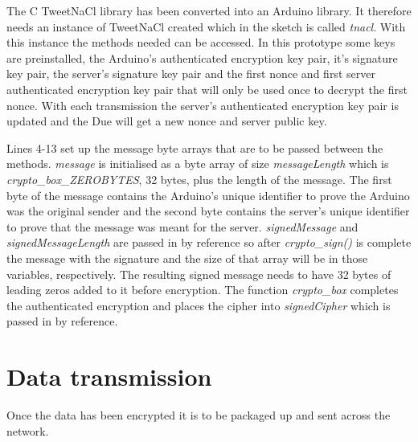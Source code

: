 The C TweetNaCl library has been converted into an Arduino library. It therefore needs an instance of TweetNaCl created which in the sketch is called \emph{tnacl}. With this instance the methods needed can be accessed. In this prototype some keys are preinstalled, the Arduino's authenticated encryption key pair, it's signature key pair, the server's signature key pair and the first nonce and first server authenticated encryption key pair that will only be used once to decrypt the first nonce. With each transmission the server's authenticated encryption key pair is updated and the Due will get a new nonce and server public key. 

Lines 4-13 set up the message byte arrays that are to be passed between the methods. \emph{message} is initialised as a byte array of size \emph{messageLength} which is \emph{crypto\_box\_ZEROBYTES}, 32 bytes, plus the length of the message. The first byte of the message contains the Arduino's unique identifier to prove the Arduino was the original sender and the second byte contains the server's unique identifier to prove that the message was meant for the server. \emph{signedMessage} and \emph{signedMessageLength} are passed in by reference so after \emph{crypto\_sign()} is complete the message with the signature and the size of that array will be in those variables, respectively. The resulting signed message needs to have 32 bytes of leading zeros added to it before encryption. The function \emph{crypto\_box} completes the authenticated encryption and places the cipher into \emph{signedCipher} which is passed in by reference. 

\clearpage

\section{Data transmission}
Once the data has been encrypted it is to be packaged up and sent across the network.

